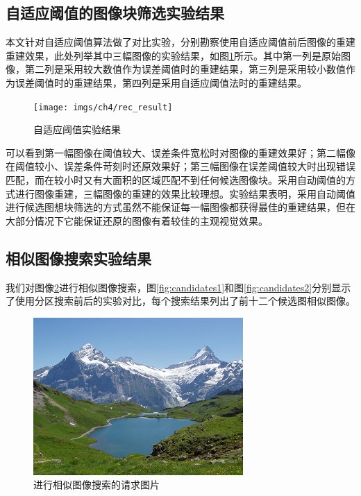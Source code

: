 \subsection{自适应阈值的图像块筛选实验结果}
本文针对自适应阈值算法做了对比实验，分别勘察使用自适应阈值前后图像的重建重建效果，此处列举其中三幅图像的实验结果，如图\ref{fig:result}所示。其中第一列是原始图像，第二列是采用较大数值作为误差阈值时的重建结果，第三列是采用较小数值作为误差阈值时的重建结果，第四列是采用自适应阈值法时的重建结果。

\begin{figure}
\centering\texttt{[image: imgs/ch4/rec\_result]}
\caption{自适应阈值实验结果}
\label{fig:result}
\end{figure}

可以看到第一幅图像在阈值较大、误差条件宽松时对图像的重建效果好；第二幅像在阈值较小、误差条件苛刻时还原效果好；第三幅图像在误差阈值较大时出现错误匹配，而在较小时又有大面积的区域匹配不到任何候选图像块。采用自动阈值的方式进行图像重建，三幅图像的重建的效果比较理想。实验结果表明，采用自动阈值进行候选图想块筛选的方式虽然不能保证每一幅图像都获得最佳的重建结果，但在大部分情况下它能保证还原的图像有着较佳的主观视觉效果。


\subsection{相似图像搜索实验结果}
我们对图像\ref{fig:candi_query}进行相似图像搜索，图\ref{fig:candidates1}和图\ref{fig:candidates2}分别显示了使用分区搜索前后的实验对比，每个搜索结果列出了前十二个候选图相似图像。
\begin{figure}
\centering\includegraphics[width=8cm]{imgs/ch4/candi_query}
\caption{进行相似图像搜索的请求图片}
\label{fig:candi_query}
\end{figure}

